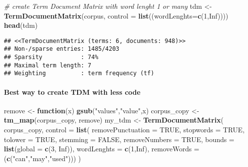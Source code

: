 \documentclass[
]{article}
\newenvironment{Shaded}{\begin{snugshade}}{\end{snugshade}}
\newcommand{\AttributeTok}[1]{\textcolor[rgb]{0.13,0.29,0.53}{#1}}
\newcommand{\CommentTok}[1]{\textcolor[rgb]{0.56,0.35,0.01}{\textit{#1}}}
\newcommand{\ConstantTok}[1]{\textcolor[rgb]{0.56,0.35,0.01}{#1}}
\newcommand{\ControlFlowTok}[1]{\textcolor[rgb]{0.13,0.29,0.53}{\textbf{#1}}}
\newcommand{\DecValTok}[1]{\textcolor[rgb]{0.00,0.00,0.81}{#1}}
\newcommand{\FunctionTok}[1]{\textcolor[rgb]{0.13,0.29,0.53}{\textbf{#1}}}
\newcommand{\NormalTok}[1]{#1}
\newcommand{\OtherTok}[1]{\textcolor[rgb]{0.56,0.35,0.01}{#1}}
\newcommand{\StringTok}[1]{\textcolor[rgb]{0.31,0.60,0.02}{#1}}
\begin{document}
\begin{Shaded}
\begin{Highlighting}[]
\CommentTok{\# create Term Document Matrix with word lenght 1 or many}
\NormalTok{tdm }\OtherTok{\textless{}{-}} \FunctionTok{TermDocumentMatrix}\NormalTok{(corpus, }\AttributeTok{control =} \FunctionTok{list}\NormalTok{((}\AttributeTok{wordLenghts=}\FunctionTok{c}\NormalTok{(}\DecValTok{1}\NormalTok{,}\ConstantTok{Inf}\NormalTok{))))}
\FunctionTok{head}\NormalTok{(tdm)}
\end{Highlighting}
\end{Shaded}

\begin{verbatim}
## <<TermDocumentMatrix (terms: 6, documents: 948)>>
## Non-/sparse entries: 1485/4203
## Sparsity           : 74%
## Maximal term length: 7
## Weighting          : term frequency (tf)
\end{verbatim}

\hypertarget{best-way-to-create-tdm-with-less-code}{%
\paragraph{Best way to create TDM with less
code}\label{best-way-to-create-tdm-with-less-code}}

\begin{Shaded}
\begin{Highlighting}[]
\NormalTok{remove }\OtherTok{\textless{}{-}} \ControlFlowTok{function}\NormalTok{(x) }\FunctionTok{gsub}\NormalTok{(}\StringTok{"values"}\NormalTok{,}\StringTok{"value"}\NormalTok{,x)}
\NormalTok{corpus\_copy }\OtherTok{\textless{}{-}}  \FunctionTok{tm\_map}\NormalTok{(corpus\_copy, remove)}
\NormalTok{my\_tdm }\OtherTok{\textless{}{-}} \FunctionTok{TermDocumentMatrix}\NormalTok{(}
\NormalTok{  corpus\_copy,}
  \AttributeTok{control =}
    \FunctionTok{list}\NormalTok{(}
      \AttributeTok{removePunctuation =} \ConstantTok{TRUE}\NormalTok{,}
      \AttributeTok{stopwords =} \ConstantTok{TRUE}\NormalTok{,}
      \AttributeTok{tolower =} \ConstantTok{TRUE}\NormalTok{,}
      \AttributeTok{stemming =} \ConstantTok{FALSE}\NormalTok{,}
      \AttributeTok{removeNumbers =} \ConstantTok{TRUE}\NormalTok{,}
      \AttributeTok{bounds =} \FunctionTok{list}\NormalTok{(}\AttributeTok{global =} \FunctionTok{c}\NormalTok{(}\DecValTok{3}\NormalTok{, }\ConstantTok{Inf}\NormalTok{)),}
      \AttributeTok{wordLenghts =} \FunctionTok{c}\NormalTok{(}\DecValTok{1}\NormalTok{,}\ConstantTok{Inf}\NormalTok{),}
      \AttributeTok{removeWords =}\NormalTok{ (}\FunctionTok{c}\NormalTok{(}\StringTok{"can"}\NormalTok{,}\StringTok{"may"}\NormalTok{,}\StringTok{"used"}\NormalTok{)))}
\NormalTok{)}
\end{Highlighting}
\end{Shaded}
\end{document}
